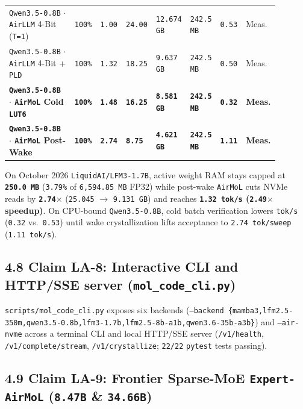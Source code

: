 \documentclass[10pt]{article}
\begin{document}
{\begin{longtable}{@{}L{0.31\linewidth}C{0.07\linewidth}C{0.08\linewidth}C{0.07\linewidth}C{0.11\linewidth}C{0.11\linewidth}C{0.07\linewidth}L{0.07\linewidth}@{}}
\midrule
\texttt{Qwen3.5-0.8B} $\cdot$ \texttt{AirLLM} 4-Bit (\texttt{T=1}) & \texttt{100\%} & \texttt{1.00} & \texttt{24.00} & \texttt{12.674 GB} & \texttt{242.5 MB} & \texttt{0.53} & Meas. \\
\texttt{Qwen3.5-0.8B} $\cdot$ \texttt{AirLLM} 4-Bit + \texttt{PLD} & \texttt{100\%} & \texttt{1.32} & \texttt{18.25} & \texttt{9.637 GB} & \texttt{242.5 MB} & \texttt{0.50} & Meas. \\
\textbf{\texttt{Qwen3.5-0.8B} $\cdot$ \texttt{AirMoL} Cold \texttt{LUT6}} & \textbf{\texttt{100\%}} & \textbf{\texttt{1.48}} & \textbf{\texttt{16.25}} & \textbf{\texttt{8.581 GB}} & \textbf{\texttt{242.5 MB}} & \textbf{\texttt{0.32}} & \textbf{Meas.} \\
\textbf{\texttt{Qwen3.5-0.8B} $\cdot$ \texttt{AirMoL} Post-Wake} & \textbf{\texttt{100\%}} & \textbf{\texttt{2.74}} & \textbf{\texttt{8.75}} & \textbf{\texttt{4.621 GB}} & \textbf{\texttt{242.5 MB}} & \textbf{\texttt{1.11}} & \textbf{Meas.} \\
\bottomrule
\end{longtable}
}

On October 2026 \texttt{LiquidAI/LFM3-1.7B}, active weight RAM stays capped at \textbf{\texttt{250.0 MB}} (\texttt{3.79\%} of \texttt{6,594.85 MB} FP32) while post-wake \texttt{AirMoL} cuts NVMe reads by \textbf{\texttt{2.74$\times$}} (\texttt{25.045} $\to$ \texttt{9.131 GB}) and reaches \textbf{\texttt{1.32 tok/s} (\texttt{2.49$\times$} speedup)}. On CPU-bound \texttt{Qwen3.5-0.8B}, cold batch verification lowers \texttt{tok/s} (\texttt{0.32} vs.\ \texttt{0.53}) until wake crystallization lifts acceptance to \texttt{2.74 tok/sweep} (\texttt{1.11 tok/s}).

\subsection{4.8 Claim LA-8: Interactive CLI and HTTP/SSE server (\texttt{mol\_code\_cli.py})}\label{claim-la8}

\texttt{scripts/mol\_code\_cli.py} exposes six backends (\texttt{--backend \{mamba3,lfm2.5-350m,qwen3.5-0.8b,lfm3-1.7b,lfm2.5-8b-a1b,qwen3.6-35b-a3b\}}) and \texttt{--air-nvme} across a terminal CLI and local HTTP/SSE server (\texttt{/v1/health}, \texttt{/v1/complete/stream}, \texttt{/v1/crystallize}; \texttt{22/22} \texttt{pytest} tests passing).

\subsection{4.9 Claim LA-9: Frontier Sparse-MoE \texttt{Expert-AirMoL} (\texttt{8.47B} \& \texttt{34.66B})}\label{claim-la9}
\end{document}
